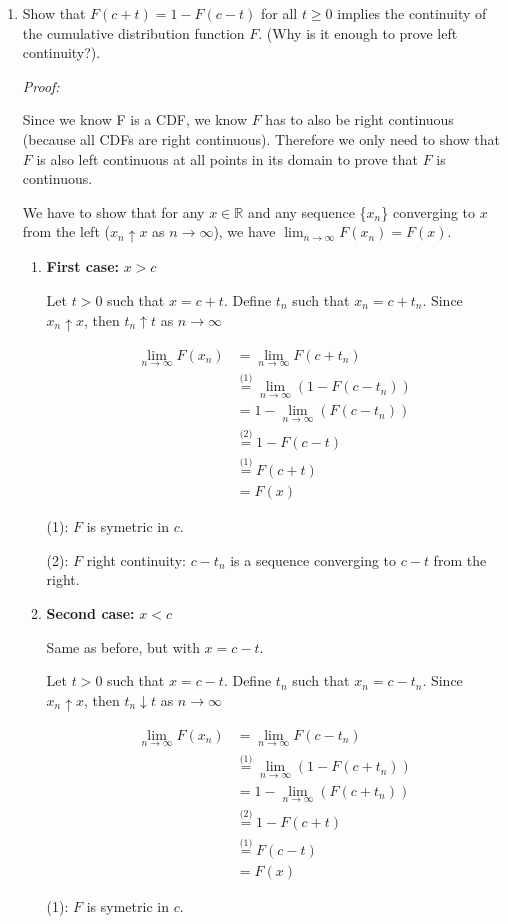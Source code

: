 \documentclass[12pt]{article}
\begin{document}
\begin{enumerate}
    \item Show that $F(c+t)=1-F(c-t)$ for all $t \geq 0$ implies the continuity of the cumulative distribution function $F$. (Why is it enough to prove left continuity?).
     
    \textit{Proof:}

Since we know F is a CDF, we know $F$ has to also be right continuous (because all CDFs are right continuous).  Therefore we only need to show that $F$ is also left continuous at all points in its domain to prove that $F$ is continuous.

We have to show that for any $x \in \mathbb{R}$ and any sequence \{$x_n$\} converging to $x$ from the left (\( x_n \uparrow x \) as \( n \to \infty \)), we have $\lim_{n \to \infty} F(x_n) = F(x)$.

\begin{enumerate}
    \item \textbf{First case:} $x > c$ 
    
    Let $t>0$ such that $x= c+t$. Define $t_n$ such that $x_n=c+t_n$. Since $x_n \uparrow x$, then  \( t_n \uparrow t \) as \( n \to \infty \) 

    \begin{align*}
        \lim_{n \to \infty} F(x_n) &= \lim_{n \to \infty} F(c+t_n)\\
        &\stackrel{\text{(1)}}{=} \lim_{n \to \infty} (1-F(c-t_n))\\
        &= 1-\lim_{n \to \infty} (F(c-t_n))\\
        &\stackrel{\text{(2)}}{=} 1-F(c-t)\\
        &\stackrel{\text{(1)}}{=} F(c+t)\\
        &= F(x)
    \end{align*}

    {\footnotesize
(1): $F$ is symetric in $c$.

(2): $F$ right continuity: $c-t_n$ is a sequence converging to $c-t$ from the right. 
    }

\item \textbf{Second case:} $x < c$

Same as before, but with $x=c-t$.

Let $t>0$ such that $x= c-t$. Define $t_n$ such that $x_n=c-t_n$. Since $x_n \uparrow x$, then  \( t_n \downarrow t \) as \( n \to \infty \) 

\begin{align*}
    \lim_{n \to \infty} F(x_n) &= \lim_{n \to \infty} F(c-t_n)\\
    &\stackrel{\text{(1)}}{=} \lim_{n \to \infty} (1-F(c+t_n))\\
    &= 1-\lim_{n \to \infty} (F(c+t_n))\\
    &\stackrel{\text{(2)}}{=} 1-F(c+t)\\
    &\stackrel{\text{(1)}}{=} F(c-t)\\
    &= F(x)
\end{align*}
{\footnotesize
(1): $F$ is symetric in $c$.

}
\end{enumerate}
\end{enumerate}
\end{document}
